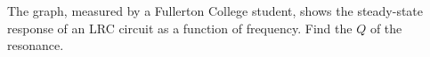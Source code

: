 The graph, measured by a Fullerton College student, shows the steady-state response
of an LRC circuit as a function of frequency. Find the $Q$ of the resonance.\answercheck

